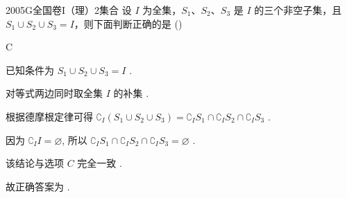 
\begin{problem}{2005}{G}{全国卷I（理）}{2}{集合}
设 $ I $ 为全集，$ S_1 $、$ S_2 $、$ S_3 $ 是 $ I $ 的三个非空子集，且 $ S_1\cup S_2\cup S_3=I $，则下面判断正确的是 (\hspace{1cm})
\begin{choices}
\end{choices}
\end{problem}

\begin{answer}
C
\end{answer}

\begin{solutions}
已知条件为 $S_1 \cup S_2 \cup S_3 = I$ .

对等式两边同时取全集 $I$ 的补集 .

根据德摩根定律可得 $\complement_I (S_1 \cup S_2 \cup S_3) = \complement_I S_1 \cap \complement_I S_2 \cap \complement_I S_3$ .

因为 $\complement_I I = \varnothing$, 所以 $\complement_I S_1 \cap \complement_I S_2 \cap \complement_I S_3 = \varnothing$ .

该结论与选项 $C$ 完全一致 .

故正确答案为  .
\end{solutions}